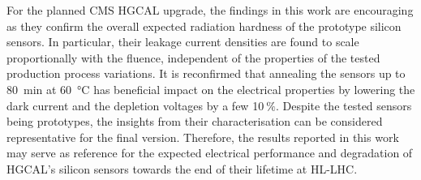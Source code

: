 For the planned CMS HGCAL upgrade, the findings in this work are encouraging as they confirm the overall expected radiation hardness of the prototype silicon sensors.
In particular, their leakage current densities are found to scale proportionally with the fluence, independent of the properties of the tested production process variations.
It is reconfirmed that annealing the sensors up to \SI{80}{\minute} at \SI{60}{\celsius} has beneficial impact on the electrical properties by lowering the dark current and the depletion voltages by a few 10$~\%$.
Despite the tested sensors being prototypes, the insights from their characterisation can be considered representative for the final version.
Therefore, the results reported in this work may serve as reference for the expected electrical performance and degradation of HGCAL's silicon sensors towards the end of their lifetime at HL-LHC.